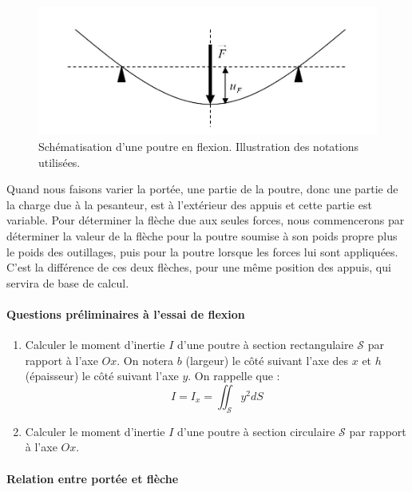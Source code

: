 \documentclass[lecture.tex]{subfiles}
\begin{document}
\begin{figure}[h!]
\centering
\includegraphics[scale=0.4]{Img_RDM_2.JPG}
\caption{Schématisation d'une poutre en flexion. Illustration des notations utilisées.}
\label{Fig_RDM_Notations2}
\end{figure}

Quand nous faisons varier la portée, une partie de la poutre, donc une partie de la charge due à la pesanteur, est à l'extérieur des appuis et cette partie est variable. Pour déterminer la flèche due aux seules forces, nous commencerons par déterminer la valeur de la flèche pour la poutre soumise à son poids propre plus le poids des outillages, puis pour la poutre lorsque les forces lui sont appliquées. C'est la différence de ces deux flèches, pour une même position des appuis, qui servira de base de calcul.


\paragraph*{Questions préliminaires à l'essai de flexion}
\begin{enumerate}
\item {} Calculer le moment d'inertie $I$ d'une poutre à section rectangulaire $\mathcal{S}$ par rapport à l'axe $Ox$. On notera $b$ (largeur) le côté suivant l'axe des $x$ et $h$ (épaisseur) le côté suivant l'axe $y$. On rappelle que :
\begin{equation}
I=I_x = \iint_{\mathcal{S}} y^2 dS
\end{equation}
\item {} Calculer le moment d'inertie $I$ d'une poutre à section circulaire $\mathcal{S}$ par rapport à l'axe $Ox$.
\end{enumerate}

\paragraph*{Relation entre portée et flèche}
\end{document}
